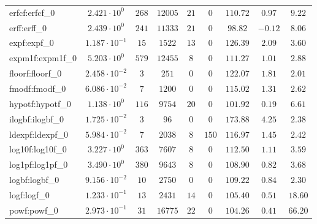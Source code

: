 \begin{tabular}{|l|c|c|c|c|c|c|c|c|}
erfcf:erfcf\_0               & $ 2.421 \cdot 10^{0}  $ & $ 268    $ & $ 12005  $ & $ 21  $ & $ 0    $ & $ 110.72      $ & $ 0.97    $ & $ 9.22    $ \\
erff:erff\_0                 & $ 2.439 \cdot 10^{0}  $ & $ 241    $ & $ 11333  $ & $ 21  $ & $ 0    $ & $ 98.82       $ & $ -0.12   $ & $ 8.06    $ \\
expf:expf\_0                 & $ 1.187 \cdot 10^{-1} $ & $ 15     $ & $ 1522   $ & $ 13  $ & $ 0    $ & $ 126.39      $ & $ 2.09    $ & $ 3.60    $ \\
expm1f:expm1f\_0             & $ 5.203 \cdot 10^{0}  $ & $ 579    $ & $ 12455  $ & $ 8   $ & $ 0    $ & $ 111.27      $ & $ 1.01    $ & $ 2.88    $ \\
floorf:floorf\_0             & $ 2.458 \cdot 10^{-2} $ & $ 3      $ & $ 251    $ & $ 0   $ & $ 0    $ & $ 122.07      $ & $ 1.81    $ & $ 2.01    $ \\
fmodf:fmodf\_0               & $ 6.086 \cdot 10^{-2} $ & $ 7      $ & $ 1200   $ & $ 0   $ & $ 0    $ & $ 115.02      $ & $ 1.31    $ & $ 2.62    $ \\
hypotf:hypotf\_0             & $ 1.138 \cdot 10^{0}  $ & $ 116    $ & $ 9754   $ & $ 20  $ & $ 0    $ & $ 101.92      $ & $ 0.19    $ & $ 6.61    $ \\
ilogbf:ilogbf\_0             & $ 1.725 \cdot 10^{-2} $ & $ 3      $ & $ 96     $ & $ 0   $ & $ 0    $ & $ 173.88      $ & $ 4.25    $ & $ 2.38    $ \\
ldexpf:ldexpf\_0             & $ 5.984 \cdot 10^{-2} $ & $ 7      $ & $ 2038   $ & $ 8   $ & $ 150  $ & $ 116.97      $ & $ 1.45    $ & $ 2.42    $ \\
log10f:log10f\_0             & $ 3.227 \cdot 10^{0}  $ & $ 363    $ & $ 7607   $ & $ 8   $ & $ 0    $ & $ 112.50      $ & $ 1.11    $ & $ 3.59    $ \\
log1pf:log1pf\_0             & $ 3.490 \cdot 10^{0}  $ & $ 380    $ & $ 9643   $ & $ 8   $ & $ 0    $ & $ 108.90      $ & $ 0.82    $ & $ 3.68    $ \\
logbf:logbf\_0               & $ 9.156 \cdot 10^{-2} $ & $ 10     $ & $ 2750   $ & $ 0   $ & $ 0    $ & $ 109.22      $ & $ 0.84    $ & $ 2.30    $ \\
logf:logf\_0                 & $ 1.233 \cdot 10^{-1} $ & $ 13     $ & $ 2431   $ & $ 14  $ & $ 0    $ & $ 105.40      $ & $ 0.51    $ & $ 18.60   $ \\
powf:powf\_0                 & $ 2.973 \cdot 10^{-1} $ & $ 31     $ & $ 16775  $ & $ 22  $ & $ 0    $ & $ 104.26      $ & $ 0.41    $ & $ 66.20   $ \\

\end{tabular}
